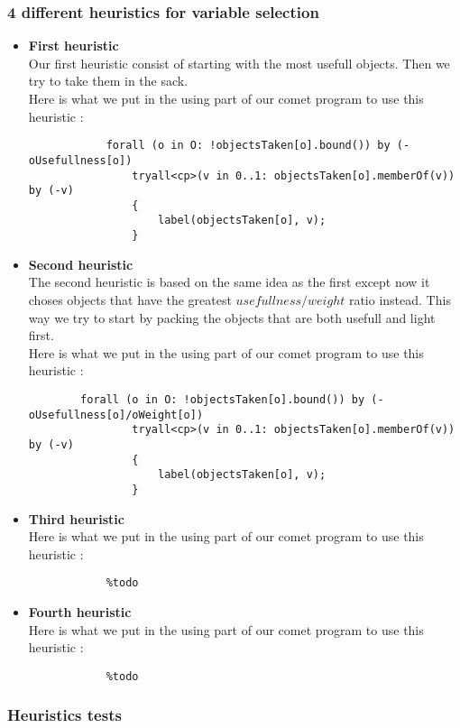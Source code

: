 \documentclass{eplDoc}
\begin{document}
\subsubsection{4 different heuristics for variable selection}
\begin{itemize}
	\item \textbf{First heuristic} \\ 
		Our first heuristic consist of starting with the most usefull objects. Then we try to take them in the sack. \\ 
		Here is what we put in the using part of our comet program to use this heuristic :
		\begin{lstlisting}
            forall (o in O: !objectsTaken[o].bound()) by (-oUsefullness[o])
                tryall<cp>(v in 0..1: objectsTaken[o].memberOf(v)) by (-v)
                {
                    label(objectsTaken[o], v);
                } 		\end{lstlisting}
	\item \textbf{Second heuristic} \\ 
		The second heuristic is based on the same idea as the first except now it choses objects that have the greatest $usefullness/weight$ ratio instead. This way we try to start by packing the objects that are both usefull and light first. \\ 
				Here is what we put in the using part of our comet program to use this heuristic :
		\begin{lstlisting}
		forall (o in O: !objectsTaken[o].bound()) by (-oUsefullness[o]/oWeight[o])
                tryall<cp>(v in 0..1: objectsTaken[o].memberOf(v)) by (-v)
                {
                    label(objectsTaken[o], v);
                } 
		\end{lstlisting}
	\item \textbf{Third heuristic} \\ 
				Here is what we put in the using part of our comet program to use this heuristic :
		\begin{lstlisting}
			%todo
		\end{lstlisting}
	\item \textbf{Fourth heuristic} \\ 
				Here is what we put in the using part of our comet program to use this heuristic :
		\begin{lstlisting}
			%todo
		\end{lstlisting}
	
\end{itemize}
\subsubsection{Heuristics tests} %
\end{document}
